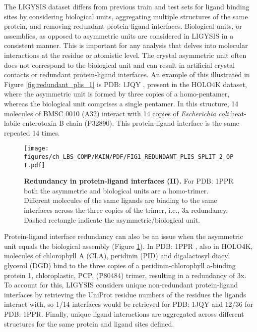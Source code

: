 The LIGYSIS dataset differs from previous train and test sets for ligand binding sites by considering biological units, aggregating multiple structures of the same protein, and removing redundant protein-ligand interfaces. Biological units, or assemblies, as opposed to asymmetric units are considered in LIGYSIS in a consistent manner. This is important for any analysis that delves into molecular interactions at the residue or atomistic level. The crystal asymmetric unit often does not correspond to the biological unit and can result in artificial crystal contacts or redundant protein-ligand interfaces. An example of this illustrated in Figure \ref{fig:redundant_plis_1} is PDB: 1JQY \cite{PICKENS_2002_ANCHOR}, present in the HOLO4K dataset, where the asymmetric unit is formed by three copies of a homo-pentamer, whereas the biological unit comprises a single pentamer. In this structure, 14 molecules of BMSC 0010 (A32) interact with 14 copies of \textit{Escherichia coli} heat-labile enterotoxin B chain (P32890). This protein-ligand interface is the same repeated 14 times.

\FloatBarrier

\begin{figure}[htb!]
    \centering
    \texttt{[image: figures/ch\_LBS\_COMP/MAIN/PDF/FIG1\_REDUNDANT\_PLIS\_SPLIT\_2\_OPT.pdf]}
    \caption[Redundancy in protein-ligand interfaces (II)]{\textbf{Redundancy in protein-ligand interfaces (II).} For PDB: 1PPR both the asymmetric and biological units are a homo-trimer. Different molecules of the same ligands are binding to the same interfaces across the three copies of the trimer, i.e., 3x redundancy. Dashed rectangle indicate the asymmetric/biological unit.}
    \label{fig:redundant_plis_2}
\end{figure}

Protein-ligand interface redundancy can also be an issue when the asymmetric unit equals the biological assembly (Figure \ref{fig:redundant_plis_2}). In PDB: 1PPR \cite{HOFMANN_1996_CAROTENOID}, also in HOLO4K, molecules of chlorophyll A (CLA), peridinin (PID) and digalactosyl diacyl glycerol (DGD) bind to the three copies of a peridinin-chlorophyll a-binding protein 1, chloroplastic, PCP, (P80484) trimer, resulting in a redundancy of 3x. To account for this, LIGYSIS considers unique non-redundant protein-ligand interfaces by retrieving the UniProt residue numbers of the residues the ligands interact with, so 1/14 interfaces would be retrieved for PDB: 1JQY and 12/36 for PDB: 1PPR. Finally, unique ligand interactions are aggregated across different structures for the same protein and ligand sites defined.

